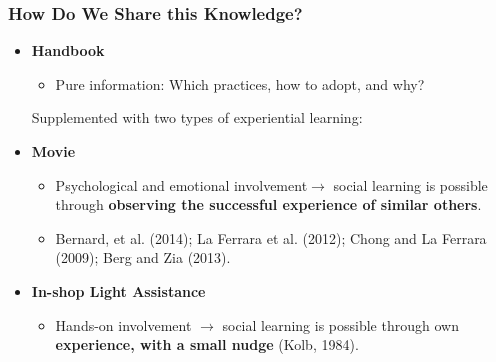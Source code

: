 \documentclass[10pt]{beamer}
\begin{document}
%
\begin{frame}
\frametitle{How Do We Share this Knowledge?}
		\begin{itemize}
		\item \textbf{Handbook}
			\begin{itemize}
			\item \textcolor[rgb]{0.00,0.07,1.00}{Pure information}: Which practices, how to adopt, and why?\\
			\end{itemize}
\bigskip
Supplemented with two types of experiential learning:
\bigskip
		\item \textbf{Movie}
			\begin{itemize}
			\item \textcolor[rgb]{0.00,0.07,1.00}{Psychological and emotional involvement}$\rightarrow$ social learning is possible through \textbf{observing the successful experience of similar others}.
			\item Bernard, et al. (2014); La Ferrara et al. (2012); Chong and La Ferrara (2009); Berg and Zia (2013).\\
			\end{itemize}

\bigskip
		\item \textbf{In-shop Light Assistance}
			\begin{itemize}
			\item \textcolor[rgb]{0.00,0.07,1.00}{Hands-on involvement} $\rightarrow$ social learning is possible through own \textbf{experience, with a small nudge} (Kolb, 1984).
			\end{itemize}
			\vspace{0.05in}
		\end{itemize}

\end{frame}
\end{document}
